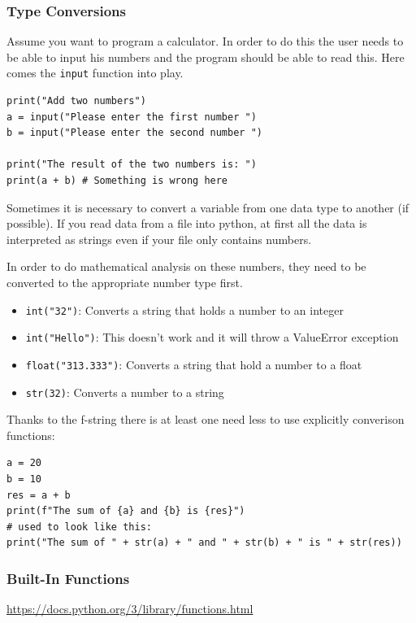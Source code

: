 \documentclass[10pt, a4paper]{beamer} %
\begin{document}
\begin{frame}
  \frametitle{Type Conversions}

  Assume you want to program a calculator.
  In order to do this the user needs to be able to input his numbers and the program should be able to read this.
  Here comes the \lstinline!input! function into play.

  \begin{lstlisting}
print("Add two numbers")
a = input("Please enter the first number ")
b = input("Please enter the second number ")

print("The result of the two numbers is: ")
print(a + b) # Something is wrong here
\end{lstlisting}


  \framebreak
  Sometimes it is necessary to convert a variable from one data type to another (if possible). If you
  read data from a file into python, at first all the data is interpreted as strings even if your file only
  contains numbers.

  In order to do mathematical analysis on these numbers, they need to be converted to the appropriate number type first.

  \begin{itemize}
    \item \lstinline!int("32")!: Converts a string that holds a number to an integer
    \item \lstinline!int("Hello")!: This doesn't work and it will throw a ValueError exception
    \item \lstinline!float("313.333")!: Converts a string that hold a number to a float
    \item \lstinline!str(32)!: Converts a number to a string
  \end{itemize}

  Thanks to the f-string there is at least one need less to use explicitly converison functions:
  \begin{examples}
    \begin{lstlisting}
a = 20
b = 10
res = a + b
print(f"The sum of {a} and {b} is {res}")
# used to look like this:
print("The sum of " + str(a) + " and " + str(b) + " is " + str(res))
\end{lstlisting}
  \end{examples}
\end{frame}

\begin{frame}[c]\frametitle{Built-In Functions}
  \url{https://docs.python.org/3/library/functions.html}
\end{frame}
\end{document}
